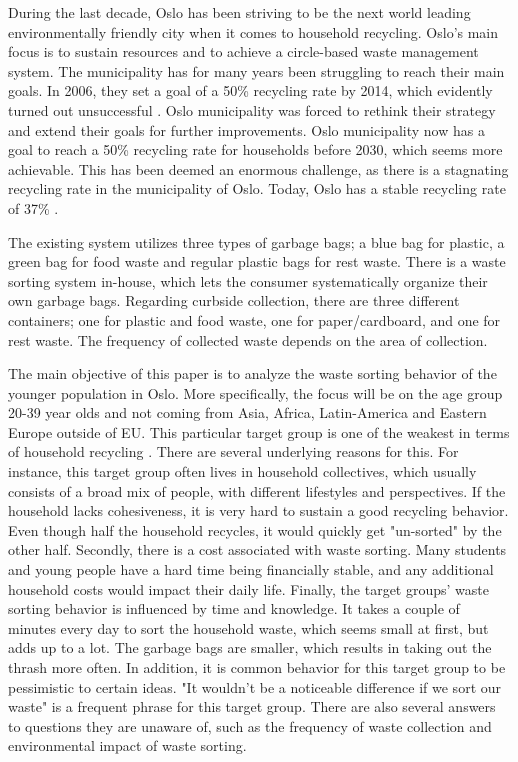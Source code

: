 During the last decade, Oslo has been striving to be the next world leading environmentally friendly city when it comes to household recycling. Oslo's main focus is to sustain resources and to achieve a circle-based waste management system. The municipality has for many years been struggling to reach their main goals. In 2006, they set a goal of a 50\% recycling rate by 2014, which evidently turned out unsuccessful \cite{effect}. Oslo municipality was forced to rethink their strategy and extend their goals for further improvements. Oslo municipality now has a goal to reach a 50\% recycling rate for households before 2030, which seems more achievable. This has been deemed an enormous challenge, as there is a stagnating recycling rate in the municipality of Oslo. Today, Oslo has a stable recycling rate of 37\% \cite{oslokommune}.

\indent \newline 
The existing system utilizes three types of garbage bags; a blue bag for plastic, a green bag for food waste and regular plastic bags for rest waste. There is a waste sorting system in-house, which lets the consumer systematically organize their own garbage bags. Regarding curbside collection, there are three different containers; one for plastic and food waste, one for paper/cardboard, and one for rest waste. The frequency of collected waste depends on the area of collection. 

\indent \newline
The main objective of this paper is to analyze the waste sorting behavior of the younger population in Oslo. More specifically, the focus will be on the age group 20-39 year olds and not coming from Asia, Africa, Latin-America and Eastern Europe outside of EU. This particular target group is one of the weakest in terms of household recycling \cite[p. 38]{Mikkelborg}. There are several underlying reasons for this. For instance, this target group often lives in household collectives, which usually consists of a broad mix of people, with different lifestyles and perspectives. If the household lacks cohesiveness, it is very hard to sustain a good recycling behavior. Even though half the household recycles, it would quickly get "un-sorted" by the other half. Secondly, there is a cost associated with waste sorting. Many students and young people have a hard time being financially stable, and any additional household costs would impact their daily life. Finally, the target groups' waste sorting behavior is influenced by time and knowledge. It takes a couple of minutes every day to sort the household waste, which seems small at first, but adds up to a lot. The garbage bags are smaller, which results in taking out the thrash more often. In addition, it is common behavior for this target group to be pessimistic to certain ideas. "It wouldn’t be a noticeable difference if we sort our waste" is a frequent phrase for this target group. There are also several answers to questions they are unaware of, such as the frequency of waste collection and environmental impact of waste sorting. 

